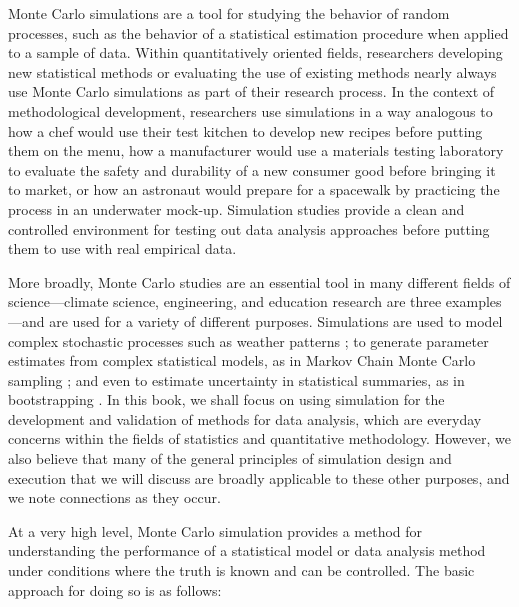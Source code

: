 \documentclass[
]{book}
\begin{document}
Monte Carlo simulations are a tool for studying the behavior of random processes, such as the behavior of a statistical estimation procedure when applied to a sample of data.
Within quantitatively oriented fields, researchers developing new statistical methods or evaluating the use of existing methods nearly always use Monte Carlo simulations as part of their research process.
In the context of methodological development, researchers use simulations in a way analogous to how a chef would use their test kitchen to develop new recipes before putting them on the menu, how a manufacturer would use a materials testing laboratory to evaluate the safety and durability of a new consumer good before bringing it to market, or how an astronaut would prepare for a spacewalk by practicing the process in an underwater mock-up.
Simulation studies provide a clean and controlled environment for testing out data analysis approaches before putting them to use with real empirical data.

More broadly, Monte Carlo studies are an essential tool in many different fields of science---climate science, engineering, and education research are three examples---and are used for a variety of different purposes.
Simulations are used to model complex stochastic processes such as weather patterns \citep{jones2012IntroductionScientificProgramming, robert2010IntroducingMonteCarlo};
to generate parameter estimates from complex statistical models, as in Markov Chain Monte Carlo sampling \citep{gelman2013BayesianDataAnalysis};
and even to estimate uncertainty in statistical summaries, as in bootstrapping \citep{davison1997BootstrapMethodsTheir}.
In this book, we shall focus on using simulation for the development and validation of methods for data analysis, which are everyday concerns within the fields of statistics and quantitative methodology.
However, we also believe that many of the general principles of simulation design and execution that we will discuss are broadly applicable to these other purposes, and we note connections as they occur.

At a very high level, Monte Carlo simulation provides a method for understanding the performance of a statistical model or data analysis method under conditions where the truth is known and can be controlled.
The basic approach for doing so is as follows:
\end{document}
